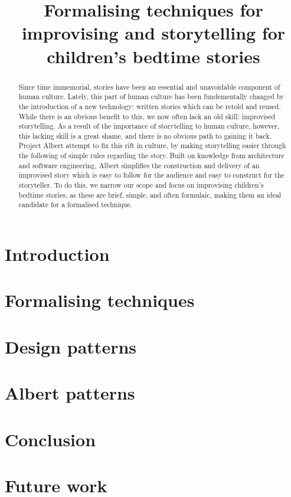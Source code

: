 \documentclass{tufte-handout}
\title{Formalising techniques for improvising and storytelling for children's bedtime stories}
\begin{document}
\maketitle
\begin{abstract}
    Since time immemorial, stories have been an essential and unavoidable component of human culture. Lately, this part of human culture has been fundementally changed by the introduction of a new technology: written stories which can be retold and reused.
    While there is an obvious benefit to this, we now often lack an old skill: improvised storytelling. As a result of the importance of storytelling to human culture, however, this lacking skill is a great shame, and there is no obvious path to gaining it back. 
    Project Albert attempt to fix this rift in culture, by making storytelling easier through the following of simple rules regarding the story. Built on knowledge from architecture and software engineering, Albert simplifies the construction and delivery of an improvised story which is easy to follow for the audience and easy to construct for the storyteller. To do this, we narrow our scope and focus on improvising children's bedtime stories, as these are brief, simple, and often formulaic, making them an ideal candidate for a formalised technique.
\end{abstract}
\section{Introduction}

\section{Formalising techniques}

\section{Design patterns}

\section{Albert patterns}

\section{Conclusion}

\section{Future work}
\end{document}

